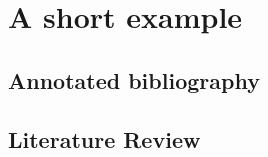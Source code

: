 \documentclass{harvard-thesis}
\begin{document}

\maketitle
\copyrightpage
\abstractpage
\tableofcontents
\listoffigures
\dedicationpage
\acknowledgments
\onehalfspacing




\citep{Hastie2001}
\citep{Blitzstein2019}

\chapter{A short example}
\section{Annotated bibliography}
\cite{Wang2020}
\cite{Lloyd}
\section{Literature Review}
\singlespacing

\appendix

\clearpage


\end{document}
